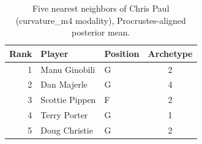 \begin{table}[htbp]
  \centering\small
  \begin{tabular}{rllc}
    \toprule
    Rank & Player & Position & Archetype \\
    \midrule
    1 & Manu Ginobili & G & 2 \\
    2 & Dan Majerle & G & 4 \\
    3 & Scottie Pippen & F & 2 \\
    4 & Terry Porter & G & 1 \\
    5 & Doug Christie & G & 2 \\
    \bottomrule
  \end{tabular}
  \caption{Five nearest neighbors of Chris Paul (curvature_m4 modality), Procrustes-aligned posterior mean.}
  \label{tab:Chris_Paul_neighbors_curvature_m4}
\end{table}

